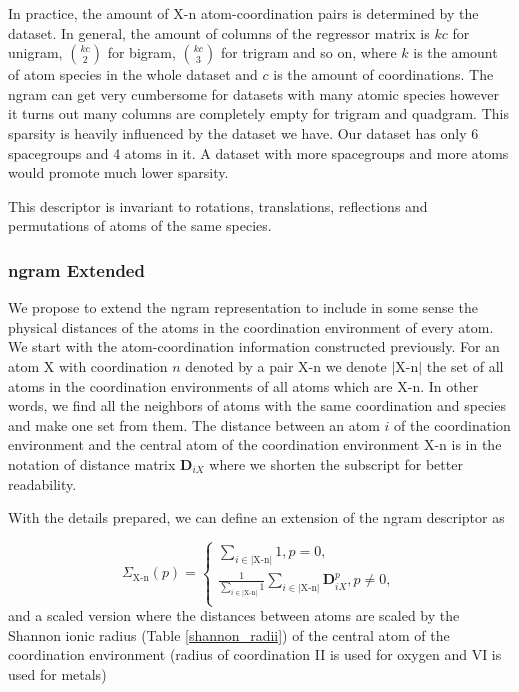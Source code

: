 \documentclass[11pt,oneside,czech,american]{book} %
\theoremstyle{definition} %
\theoremstyle{definition}
\begin{document}
In practice, the amount of X-n atom-coordination pairs is determined by the dataset. In general, the amount of columns of the regressor matrix is $kc$ for unigram, $\binom{kc}{2}$ for bigram, $\binom{kc}{3}$ for trigram and so on, where $k$ is the amount of atom species in the whole dataset and $c$ is the amount of coordinations. The ngram can get very cumbersome for datasets with many atomic species however it turns out many columns are completely empty for trigram and quadgram. This sparsity is heavily influenced by the dataset we have. Our dataset has only 6 spacegroups and 4 atoms in it. A dataset with more spacegroups and more atoms would promote much lower sparsity.

This descriptor is invariant to rotations, translations, reflections and permutations of atoms of the same species. 

\subsubsection{ngram Extended}
We propose to extend the ngram representation to include in some sense the physical distances of the atoms in the coordination environment of every atom. We start with the atom-coordination information constructed previously. For an atom X with coordination $n$ denoted by a pair X-n we denote $|\text{X-n}|$ the set of all atoms in the coordination environments of all atoms which are X-n. In other words, we find all the neighbors of atoms with the same coordination and species and make one set from them. The distance between an atom $i$ of the coordination environment and the central atom of the coordination environment X-n is in the notation of distance matrix $\bm{D}_{iX}$ where we shorten the subscript for better readability. 

With the details prepared, we can define an extension of the ngram descriptor as

\begin{equation}
	\Sigma_{\text{X-n}}(p) =
	\begin{cases}
		\sum_{i \in |\text{X-n}|}1, p=0, \\
		\frac{1}{\sum_{i \in |\text{X-n}|}1}\sum_{i \in |\text{X-n}|} \bm{D}_{i X}^p, p \neq 0, \\
		
	\end{cases}
\label{proposed}
\end{equation}
and a scaled version where the distances between atoms are scaled by the Shannon ionic radius (Table \ref{shannon_radii}) of the central atom of the coordination environment (radius of coordination II is used for oxygen and VI is used for metals)
\end{document}
